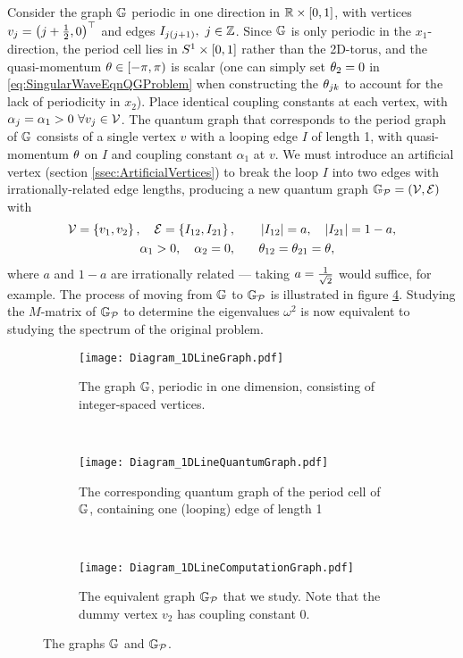 Consider the graph $\mathbb{G}$ periodic in one direction in $\mathbb{R}\times\left[ 0,1 \right]$, with vertices $v_j = \left( j + \frac{1}{2}, 0 \right)^\top$ and edges $I_{j\bracs{j+1}}, \ j\in\integers$.
Since $\mathbb{G}$ is only periodic in the $x_1$-direction, the period cell lies in $S^1\times\left[ 0,1 \right]$ rather than the 2D-torus, and the quasi-momentum $\theta\in\left[-\pi,\pi\right)$ is scalar (one can simply set $\theta_2=0$ in \eqref{eq:SingularWaveEqnQGProblem} when constructing the $\theta_{jk}$ to account for the lack of periodicity in $x_2$).
Place identical coupling constants at each vertex, with $\alpha_j = \alpha_1>0 \ \forall v_j\in\mathcal{V}$.
The quantum graph that corresponds to the period graph of $\mathbb{G}$ consists of a single vertex $v$ with a looping edge $I$ of length 1, with quasi-momentum $\theta$ on $I$ and coupling constant $\alpha_1$ at $v$.
We must introduce an artificial vertex (section \ref{ssec:ArtificialVertices}) to break the loop $I$ into two edges with irrationally-related edge lengths, producing a new quantum graph $\mathbb{G}_{\mathcal{P}}=\left( \mathcal{V}, \mathcal{E} \right)$ with
\begin{align*}
	\mathcal{V} = \left\{  v_1 , v_2  \right\}, \quad \mathcal{E} = \left\{  I_{12}, I_{21}  \right\},
	&\qquad \left\lvert I_{12} \right\rvert = a, \quad \left\lvert I_{21} \right\rvert = 1-a,  \\
	\alpha_1 >0, \quad \alpha_2 = 0,
	&\qquad \theta_{12} = \theta_{21} = \theta,
\end{align*}
where $a$ and $1-a$ are irrationally related --- taking $a = \frac{1}{\sqrt{2}}$ would suffice, for example.
The process of moving from $\mathbb{G}$ to $\mathbb{G}_{\mathcal{P}}$ is illustrated in figure \ref{fig:Diagram_1DExample}.
Studying the $M$-matrix of $\mathbb{G}_{\mathcal{P}}$ to determine the eigenvalues $\omega^2$ is now equivalent to studying the spectrum of the original problem.
\begin{figure}[b!]
	\centering
	\begin{subfigure}[t]{0.3\textwidth}
		\centering
		\texttt{[image: Diagram\_1DLineGraph.pdf]}
		\caption{\label{fig:Diagram_1DLineGraph} The graph $\mathbb{G}$, periodic in one dimension, consisting of integer-spaced vertices.}
	\end{subfigure}
	~
	\begin{subfigure}[t]{0.3\textwidth}
		\centering
		\texttt{[image: Diagram\_1DLineQuantumGraph.pdf]}
		\caption{\label{fig:Diagram_1DLineQuantumGraph} The corresponding quantum graph of the period cell of $\mathbb{G}$, containing one (looping) edge of length 1}
	\end{subfigure}
	~
	\begin{subfigure}[t]{0.3\textwidth}
		\centering
		\texttt{[image: Diagram\_1DLineComputationGraph.pdf]}	
		\caption{\label{fig:Diagram_1DLineComputationGraph} The equivalent graph $\mathbb{G}_{\mathcal{P}}$ that we study. Note that the dummy vertex $v_2$ has coupling constant 0.}
	\end{subfigure}
	\caption{\label{fig:Diagram_1DExample} The graphs $\mathbb{G}$ and $\mathbb{G}_{\mathcal{P}}$.}
\end{figure} \newline

